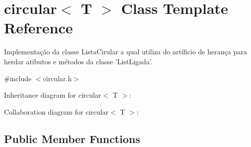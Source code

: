 \hypertarget{classcircular}{\section{circular$<$ T $>$ Class Template Reference}
\label{classcircular}
}


Implementação da classe Lista\-Cirular a qual utiliza do artíficio de herança para herdar atibutos e métodos da classe 'List\-Ligada'.  




{\ttfamily \#include $<$circular.\-h$>$}



Inheritance diagram for circular$<$ T $>$\-:


Collaboration diagram for circular$<$ T $>$\-:
\subsection*{Public Member Functions}

